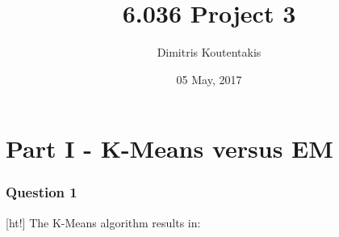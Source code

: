 \documentclass[letterpaper, 12pt]{article}
\begin{document}
\title{6.036 Project 3 \vspace{8mm}}
\author{ Dimitris Koutentakis}
\date{05 May, 2017}
\maketitle
\pagebreak
\part*{Part I - K-Means versus EM}

\vspace{5mm}

\section*{Question 1}[ht!]
The K-Means algorithm results in:
\end{document}
